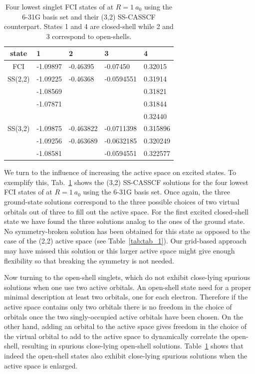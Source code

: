 \documentclass[aps,prb,reprint,showkeys,superscriptaddress]{revtex4-1}
\begin{document}
\begin{table}
  \caption{Four lowest singlet FCI states of  at $R=1~a_0$ using the 6-31G basis set and their (3,2) SS-CASSCF counterpart. States 1 and 4 are closed-shell while 2 and 3 correspond to open-shells.}
  \begin{ruledtabular}
    \label{tab:tab_3}
    \begin{tabular}{cllll}
      state & 1  & 2 & 3 & 4 \\
      \hline
      FCI & -1.09897 & -0.46395 & -0.07450 & 0.32015 \\
      \hline
      SS(2,2) & -1.09225 & -0.46368 & -0.0594551 & 0.31914 \\
            & -1.08569 &  &  & 0.31821 \\
            & -1.07871 &  &  & 0.31844 \\
            &  &  &  & 0.32440 \\
      \hline
      SS(3,2) & -1.09875 & -0.463822 & -0.0711398 & 0.315896 \\
            & -1.09256 & -0.463689 & -0.0632185 & 0.320249 \\
            & -1.08581 &  & -0.0594551 & 0.322577 \\
    \end{tabular}
  \end{ruledtabular}
\end{table}

We turn to the influence of increasing the active space on excited states.
To exemplify this, Tab.~\ref{tab:tab_3} shows the (3,2) SS-CASSCF solutions for the four lowest FCI states of  at $R=1~a_0$ using the 6-31G basis set.
Once again, the three ground-state solutions correspond to the three possible choices of two virtual orbitals out of three to fill out the active space.
For the first excited closed-shell state we have found the three solutions analog to the ones of the ground state.
No symmetry-broken solution has been obtained for this state as opposed to the case of the (2,2) active space (see Table~\ref{tab:tab_1}).
Our grid-based approach may have missed this solution or this larger active space might give enough flexibility so that breaking the symmetry is not needed.

Now turning to the open-shell singlets, which do not exhibit close-lying spurious solutions when one use two active orbitals.
An open-shell state need for a proper minimal description at least two orbitals, one for each electron.
Therefore if the active space contains only two orbitals there is no freedom in the choice of orbitals once the two singly-occupied active orbitals have been chosen.
On the other hand, adding an orbital to the active space gives freedom in the choice of the virtual orbital to add to the active space to dynamically correlate the open-shell, resulting in spurious close-lying open-shell solutions.
Table~\ref{tab:tab_3} shows that indeed the open-shell states also exhibit close-lying spurious solutions when the active space is enlarged.
\end{document}
